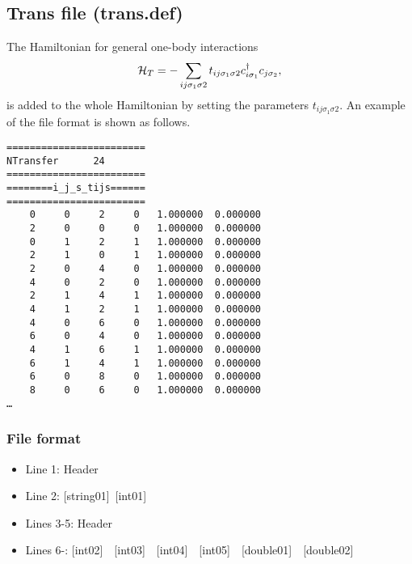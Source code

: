 \newpage
\subsection{Trans file (trans.def)}
\label{Subsec:Trans}
The Hamiltonian for general one-body interactions 
\begin{align}
{\cal H}_{T} =-\sum_{ij\sigma_1\sigma2} t_{ij\sigma_1\sigma2}c_{i\sigma_1}^{\dag}c_{j\sigma_2},
\end{align}
is added to the whole Hamiltonian by setting the parameters $t_{ij\sigma_1\sigma2}$. 
An example of the file format is shown as follows.\\
\begin{minipage}{12.5cm}
\begin{screen}
\begin{verbatim}
======================== 
NTransfer      24  
======================== 
========i_j_s_tijs====== 
======================== 
    0     0     2     0   1.000000  0.000000
    2     0     0     0   1.000000  0.000000
    0     1     2     1   1.000000  0.000000
    2     1     0     1   1.000000  0.000000
    2     0     4     0   1.000000  0.000000
    4     0     2     0   1.000000  0.000000
    2     1     4     1   1.000000  0.000000
    4     1     2     1   1.000000  0.000000
    4     0     6     0   1.000000  0.000000
    6     0     4     0   1.000000  0.000000
    4     1     6     1   1.000000  0.000000
    6     1     4     1   1.000000  0.000000
    6     0     8     0   1.000000  0.000000
    8     0     6     0   1.000000  0.000000
…
\end{verbatim}
\end{screen}
\end{minipage}

\subsubsection{File format}
\begin{itemize}
   \item  Line 1:  Header
   \item  Line 2:   [string01]~[int01]
   \item  Lines 3-5:  Header
   \item  Lines 6-: [int02]~~[int03]~~[int04]~~[int05]~~[double01]~~[double02] 
  \end{itemize}
